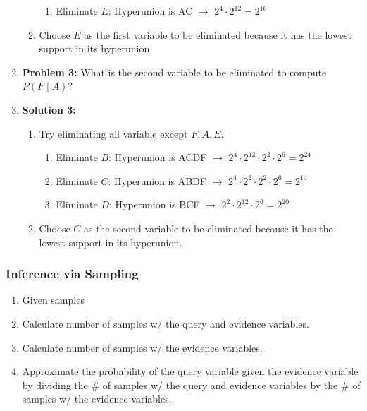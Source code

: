 \begin{example}
\begin{enumerate}
\begin{enumerate}
\begin{enumerate}
                \item Eliminate $E$: Hyperunion is AC $\rightarrow$ $\boxed{2^4 \cdot 2^{12} = 2^{16}}$
            \end{enumerate}
            \item Choose $E$ as the first variable to be eliminated because it has the lowest support in its hyperunion.
        \end{enumerate}
        \item \textbf{Problem 3:} What is the second variable to be eliminated to compute $P(F \mid A)$?
        \item \textbf{Solution 3:}
        \begin{enumerate}
            \item Try eliminating all variable except $F,A,E$.
            \begin{enumerate}
                \item Eliminate $B$: Hyperunion is ACDF $\rightarrow$ $2^4 \cdot 2^{12} \cdot 2^2 \cdot 2^6 = 2^{24}$
                \item Eliminate $C$: Hyperunion is ABDF $\rightarrow$ $\boxed{2^4 \cdot 2^2 \cdot 2^2 \cdot 2^6 = 2^{14}}$
                \item Eliminate $D$: Hyperunion is BCF $\rightarrow$ $2^2 \cdot 2^{12} \cdot 2^6 = 2^{20}$
            \end{enumerate}
            \item Choose $C$ as the second variable to be eliminated because it has the lowest support in its hyperunion.
        \end{enumerate}
    \end{enumerate}
\end{example}
\newpage

\subsubsection{Inference via Sampling}
\begin{process}
    \begin{enumerate}
        \item Given samples 
        \item Calculate number of samples w/ the query and evidence variables.
        \item Calculate number of samples w/ the evidence variables.
        \item Approximate the probability of the query variable given the evidence variable by dividing the \# of samples w/ the query and evidence variables by the \# of samples w/ the evidence variables.
    \end{enumerate}
\end{process}

